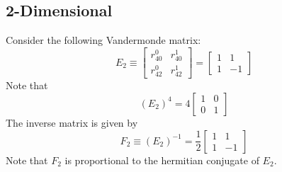 \subsection{2-Dimensional}
Consider the following Vandermonde matrix:
\begin{equation}
    E_{2} \equiv \begin{bmatrix}
        r_{40}^{0} & r_{40}^{1} \\ r_{42}^{0} & r_{42}^{1}
    \end{bmatrix} = \begin{bmatrix}
        1 & 1 \\
        1 & -1
    \end{bmatrix}
\end{equation}
Note that
\begin{equation}
    \left( E_{2} \right)^{4} = 4 \begin{bmatrix}
        1 & 0 \\
        0 & 1
    \end{bmatrix}
\end{equation}
The inverse matrix is given by
\begin{equation}
    F_{2} \equiv \left( E_{2} \right)^{-1} = \frac{1}{2} \begin{bmatrix}
        1 & 1 \\
        1 & -1
    \end{bmatrix}
\end{equation}
Note that $F_{2}$ is proportional to the hermitian conjugate of $E_{2}$.
